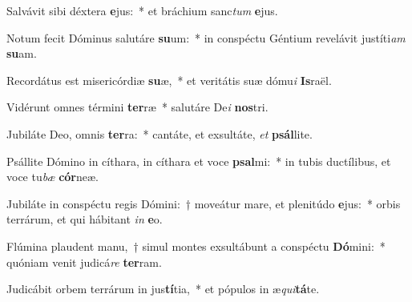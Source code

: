 \item Salvávit sibi déxtera \textbf{e}jus:~* et bráchium sanc\textit{tum} \textbf{e}jus.
\item Notum fecit Dóminus salutáre \textbf{su}um:~* in conspéctu Géntium revelávit justíti\textit{am} \textbf{su}am.
\item Recordátus est misericórdiæ \textbf{su}æ,~* et veritátis suæ dómu\textit{i} \textbf{Is}raël.
\item Vidérunt omnes términi \textbf{ter}ræ~* salutáre De\textit{i} \textbf{nos}tri.
\item Jubiláte Deo, omnis \textbf{ter}ra:~* cantáte, et exsultáte, \textit{et} \textbf{psál}lite.
\item Psállite Dómino in cíthara, in cíthara et voce \textbf{psal}mi:~* in tubis ductílibus, et voce tu\textit{bæ} \textbf{cór}neæ.
\item Jubiláte in conspéctu regis Dómini:~† moveátur mare, et plenitúdo \textbf{e}jus:~* orbis terrárum, et qui hábitant \textit{in} \textbf{e}o.
\item Flúmina plaudent manu,~† simul montes exsultábunt a conspéctu \textbf{Dó}mini:~* quóniam venit judicá\textit{re} \textbf{ter}ram.
\item Judicábit orbem terrárum in jus\textbf{tí}tia,~* et pópulos in æ\textit{qui}\textbf{tá}te.
